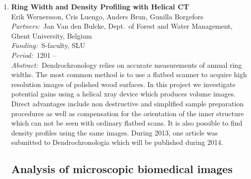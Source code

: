 \documentclass[10pt, a4paper]{article}
\newcommand{\aabstract}[1]{\emph{Abstract:~}#1}
\newcommand{\ffunding}[1]{\emph{Funding:~}#1\\}
\newcommand{\ppartners}[1]{\emph{Partners:~}#1\\}
\newcommand{\pperiod}[1]{\emph{Period:~}#1\\}
\begin{document}
\begin{enumerate}
\item
\textbf{Ring Width and Density Profiling with Helical CT}\\
Erik Wernersson, Cris Luengo, Anders Brun, Gunilla Borgefors \\
\ppartners{Jan Van den Bulcke, Dept.~of Forest and Water Management, Ghent University, Belgium}
\ffunding{S-faculty, SLU}
\pperiod{1201 --}
\aabstract{Dendrochronology relies on accurate measurements of annual ring widths. The most common method is to use a flatbed scanner to
acquire high resolution images of polished wood surfaces. In this project we investigate potential gains using a helical xray device
which produces volume images. Direct advantages include non destructive and simplified sample preparation procedures as well as compensation for the orientation of the inner structure which can not be seen with ordinary flatbed scans. It is also possible to find density profiles using the same images. During 2013, one article was submitted to Dendrochronologia which will be published during 2014.}

\clearpage


\subsection{Analysis of microscopic biomedical images}



\end{enumerate}
\end{document}
